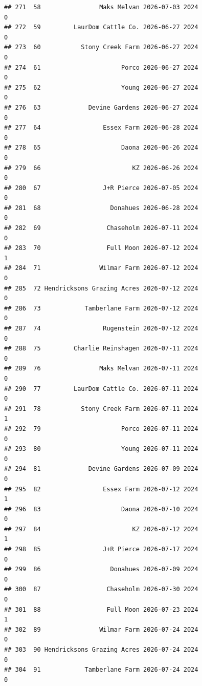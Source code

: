 \documentclass[
]{article}
\begin{document}
\begin{verbatim}
## 271  58                Maks Melvan 2026-07-03 2024                       0
## 272  59         LaurDom Cattle Co. 2026-06-27 2024                       0
## 273  60           Stony Creek Farm 2026-06-27 2024                       0
## 274  61                      Porco 2026-06-27 2024                       0
## 275  62                      Young 2026-06-27 2024                       0
## 276  63             Devine Gardens 2026-06-27 2024                       0
## 277  64                 Essex Farm 2026-06-28 2024                       0
## 278  65                      Daona 2026-06-26 2024                       0
## 279  66                         KZ 2026-06-26 2024                       0
## 280  67                 J+R Pierce 2026-07-05 2024                       0
## 281  68                   Donahues 2026-06-28 2024                       0
## 282  69                  Chaseholm 2026-07-11 2024                       0
## 283  70                  Full Moon 2026-07-12 2024                       1
## 284  71                Wilmar Farm 2026-07-12 2024                       0
## 285  72 Hendricksons Grazing Acres 2026-07-12 2024                       0
## 286  73            Tamberlane Farm 2026-07-12 2024                       0
## 287  74                 Rugenstein 2026-07-12 2024                       0
## 288  75         Charlie Reinshagen 2026-07-11 2024                       0
## 289  76                Maks Melvan 2026-07-11 2024                       0
## 290  77         LaurDom Cattle Co. 2026-07-11 2024                       0
## 291  78           Stony Creek Farm 2026-07-11 2024                       1
## 292  79                      Porco 2026-07-11 2024                       0
## 293  80                      Young 2026-07-11 2024                       0
## 294  81             Devine Gardens 2026-07-09 2024                       0
## 295  82                 Essex Farm 2026-07-12 2024                       1
## 296  83                      Daona 2026-07-10 2024                       0
## 297  84                         KZ 2026-07-12 2024                       1
## 298  85                 J+R Pierce 2026-07-17 2024                       0
## 299  86                   Donahues 2026-07-09 2024                       0
## 300  87                  Chaseholm 2026-07-30 2024                       0
## 301  88                  Full Moon 2026-07-23 2024                       1
## 302  89                Wilmar Farm 2026-07-24 2024                       0
## 303  90 Hendricksons Grazing Acres 2026-07-24 2024                       0
## 304  91            Tamberlane Farm 2026-07-24 2024                       0

\end{verbatim}
\end{document}
